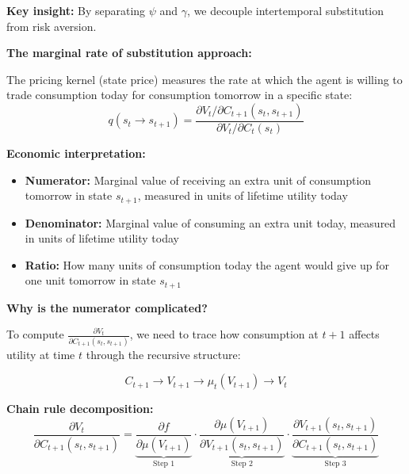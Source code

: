\documentclass{beamer}
\begin{document}
\begin{frame}[allowframebreaks]
    \textbf{Key insight:} By separating $\psi$ and $\gamma$, we decouple intertemporal substitution from risk aversion.
    
    \framebreak
    
    \textbf{The marginal rate of substitution approach:}
    
    The pricing kernel (state price) measures the rate at which the agent is willing to trade consumption today for consumption tomorrow in a specific state:
    \begin{equation*}
        q(s_t \to s_{t+1}) = \frac{\partial V_t/\partial C_{t+1}(s_t, s_{t+1})}{\partial V_t/\partial C_t(s_t)}
    \end{equation*}
    
    \textbf{Economic interpretation:}
    \begin{itemize}
        \item \textbf{Numerator:} Marginal value of receiving an extra unit of consumption tomorrow in state $s_{t+1}$, measured in units of lifetime utility today
        \item \textbf{Denominator:} Marginal value of consuming an extra unit today, measured in units of lifetime utility today
        \item \textbf{Ratio:} How many units of consumption today the agent would give up for one unit tomorrow in state $s_{t+1}$
    \end{itemize}
    
    \framebreak
    
    \textbf{Why is the numerator complicated?}
    
    To compute $\frac{\partial V_t}{\partial C_{t+1}(s_t, s_{t+1})}$, we need to trace how consumption at $t+1$ affects utility at time $t$ through the recursive structure:
    
    \begin{equation*}
        C_{t+1} \to V_{t+1} \to \mu_t(V_{t+1}) \to V_t
    \end{equation*}
    
    \textbf{Chain rule decomposition:}
    \begin{equation*}
        \frac{\partial V_t}{\partial C_{t+1}(s_t, s_{t+1})} = \underbrace{\frac{\partial f}{\partial \mu(V_{t+1})}}_{\text{Step 1}} \cdot \underbrace{\frac{\partial \mu(V_{t+1})}{\partial V_{t+1}(s_t, s_{t+1})}}_{\text{Step 2}} \cdot \underbrace{\frac{\partial V_{t+1}(s_t, s_{t+1})}{\partial C_{t+1}(s_t, s_{t+1})}}_{\text{Step 3}}
    \end{equation*}
    

\end{frame}
\end{document}

